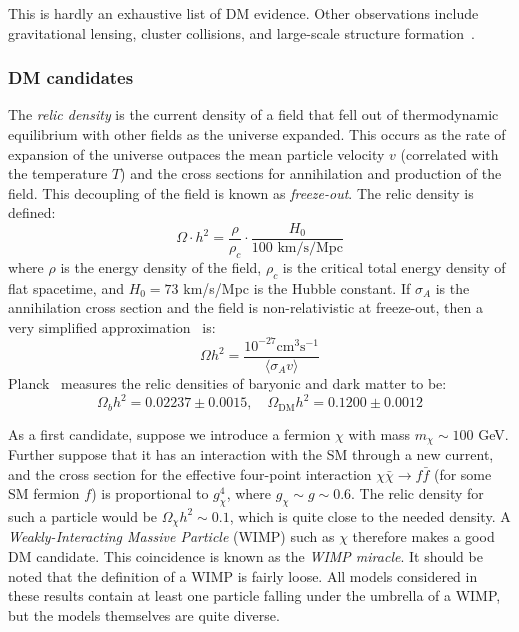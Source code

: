 This is hardly an exhaustive list of DM evidence.
Other observations include gravitational lensing, cluster collisions, and large-scale structure formation~\cite{dm1,dm2}.

\subsubsection{DM candidates}

The \emph{relic density} is the current density of a field that fell out of thermodynamic equilibrium with other fields as the universe expanded.
This occurs as the rate of expansion of the universe outpaces the mean particle velocity $v$ (correlated with the temperature $T$) and the cross sections for annihilation and production of the field.
This decoupling of the field is known as \emph{freeze-out}.
The relic density is defined:
\begin{equation}
    \Omega \cdot h^2 = \frac{\rho}{\rho_c} \cdot \frac{H_0}{100\text{ km/s/Mpc}}
\end{equation}
where $\rho$ is the energy density of the field, $\rho_c$ is the critical total energy density of flat spacetime, and $H_0=73$ km/s/Mpc is the Hubble constant.
If $\sigma_A$ is the annihilation cross section and the field is non-relativistic at freeze-out, then a very simplified approximation~\cite{dm1} is:
\begin{equation}
    \Omega h^2 = \frac{10^{-27}\mathrm{cm}^3\mathrm{s}^{-1}}{\langle \sigma_A v\rangle}
    \label{eq:theory:relic}
\end{equation}
Planck~\cite{planck} measures the relic densities of baryonic and dark matter to be:
\begin{equation}
    \Omega_b h^2 = 0.02237 \pm 0.0015, \quad \Omega_\mathrm{DM} h^2 = 0.1200 \pm 0.0012
\end{equation}

As a first candidate, suppose we introduce a fermion $\chi$ with mass $m_\chi\sim100$ GeV.
Further suppose that it has an interaction with the SM through a new current, and the cross section for the effective four-point interaction $\chi \bar\chi\rightarrow f\bar f$ (for some SM fermion $f$) is proportional to $g^4_\chi$, where $g_\chi \sim g \sim 0.6$.
The relic density for such a particle would be $\Omega_\chi h^2 \sim 0.1$, which is quite close to the needed density.
A \emph{Weakly-Interacting Massive Particle} (WIMP) such as $\chi$ therefore makes a good DM candidate.
This coincidence is known as the \emph{WIMP miracle}.
It should be noted that the definition of a WIMP is fairly loose.
All models considered in these results contain at least one particle falling under the umbrella of a WIMP, but the models themselves are quite diverse.

